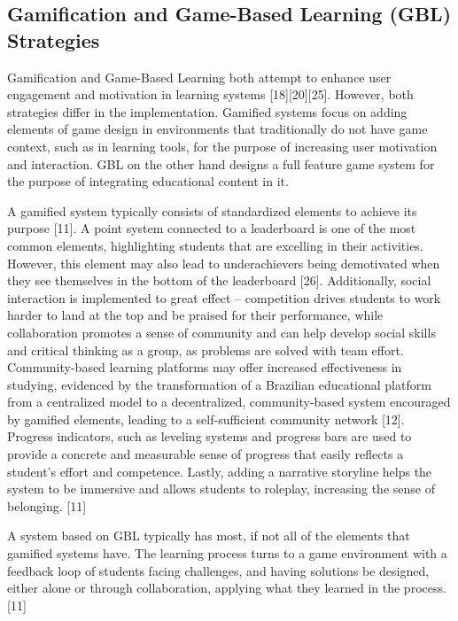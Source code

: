 \subsection{Gamification and Game-Based Learning (GBL) Strategies}

Gamification and Game-Based Learning both attempt to enhance user engagement and motivation in learning systems [18][20][25]. 
However, both strategies differ in the implementation. Gamified systems focus on adding elements of game design in environments 
that traditionally do not have game context, such as in learning tools, for the purpose of increasing user motivation and interaction. 
GBL on the other hand designs a full feature game system for the purpose of integrating educational content in it.

A gamified system typically consists of standardized elements to achieve its purpose [11]. A point system connected to a leaderboard 
is one of the most common elements, highlighting students that are excelling in their activities. However, this element may also lead 
to underachievers being demotivated when they see themselves in the bottom of the leaderboard [26]. Additionally, social interaction 
is implemented to great effect – competition drives students to work harder to land at the top and be praised for their performance, 
while collaboration promotes a sense of community and can help develop social skills and critical thinking as a group, as problems are 
solved with team effort. Community-based learning platforms may offer increased effectiveness in studying, evidenced by the transformation
of a Brazilian educational platform from a centralized model to a decentralized, community-based system encouraged by gamified elements,
leading to a self-sufficient community network [12].  Progress indicators, such as leveling systems and progress bars are used to provide
a concrete and measurable sense of progress that easily reflects a student’s effort and competence. Lastly, adding a narrative storyline
helps the system to be immersive and allows students to roleplay, increasing the sense of belonging. [11]

A system based on GBL typically has most, if not all of the elements that gamified systems have. The learning process turns to a game 
environment with a feedback loop of students facing challenges, and having solutions be designed, either alone or through collaboration, 
applying what they learned in the process. [11]

